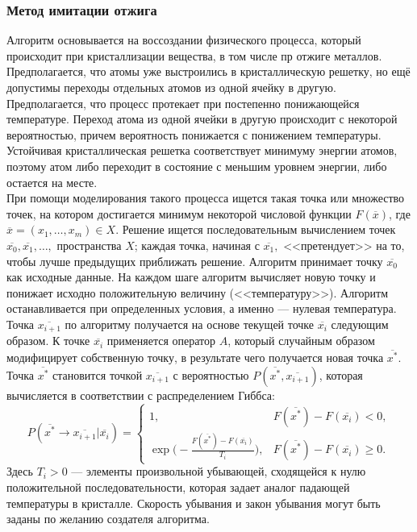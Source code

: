 \documentclass[11pt]{article}
\begin{document}
\subsubsection{Метод имитации отжига}
Алгоритм основывается на воссоздании физического процесса, который происходит при кристаллизации вещества, в том числе пр отжиге металлов. Предполагается, что атомы уже выстроились в кристаллическую решетку, но ещё допустимы переходы отдельных атомов из одной ячейку в другую. Предполагается, что процесс протекает при постепенно понижающейся температуре. Переход атома из одной ячейки в другую происходит с некоторой вероятностью, причем вероятность понижается с понижением температуры. Устойчивая кристаллическая решетка соответствует минимуму энергии атомов, поэтому атом либо переходит в состояние с меньшим уровнем энергии, либо остается на месте.\\
При помощи моделирования такого процесса ищется такая точка или множество точек, на котором достигается минимум некоторой числовой функции $F(\overline{x})$, где $\overline{x} = (x_1,\dots,x_m) \in X.$ Решение ищется последовательным вычислением точек $\overline{x_0},\overline{x_1},\dots,$ пространства $X$; каждая точка, начиная с $\overline{x_1},$ <<претендует>> на то, чтобы лучше предыдущих приближать решение. Алгоритм принимает точку $\overline{x_0}$ как исходные данные. На каждом шаге алгоритм вычисляет новую точку и понижает исходно положительную величину (<<температуру>>). Алгоритм останавливается при определенных условия, а именно --- нулевая температура.\\
Точка $\overline{x_{i+1}}$ по алгоритму получается на основе текущей точке $\overline{x_i}$ следующим образом. К точке $\overline{x_i}$ применяется оператор $A$, который случайным образом модифицирует собственную точку, в результате чего получается новая точка $\overline{x^*}$. Точка $\overline{x^*}$ становится точкой $\overline{x_{i+1}}$ с вероятностью $P(\overline{x^*},\overline{x_{i+1}})$, которая вычисляется в соответствии с распределением Гиббса:
\[ P(\overline{x^*} \rightarrow \overline{x_{i+1}}|\overline{x_i}) = \begin{cases}
1, & F(\overline{x^*}) - F(\overline{x_i}) < 0,\\
\exp\bigg(-\frac{F(\overline{x^*}) - F(\overline{x_i})}{T_i}\bigg), & F(\overline{x^*}) - F(\overline{x_i}) \geq 0.
\end{cases}\]
Здесь $T_i > 0$ --- элементы произвольной убывающей, сходящейся к нулю положительной последовательности, которая задает аналог падающей температуры в кристалле. Скорость убывания и закон убывания могут быть заданы по желанию создателя алгоритма.\\
\end{document}
